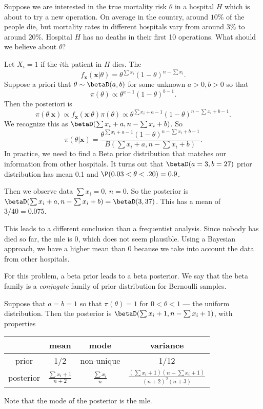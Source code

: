 \documentclass[a4paper]{article}
\begin{document}
\begin{eg}
  Suppose we are interested in the true mortality risk $\theta$ in a hospital $H$ which is about to try a new operation. On average in the country, around $10\%$ of the people die, but mortality rates in different hospitals vary from around $3\%$ to around $20\%$. Hospital $H$ has no deaths in their first 10 operations. What should we believe about $\theta$?

  Let $X_i = 1$ if the $i$th patient in $H$ dies. The
  \[
    f_{\mathbf{x}}(\mathbf{x}|\theta) = \theta^{\sum x_i}(1 - \theta)^{n - \sum x_i}.
  \]
  Suppose a priori that $\theta\sim \betaD(a, b)$ for some unknown $a > 0, b > 0$ so that
  \[
    \pi(\theta)\propto \theta^{a - 1}(1 - \theta)^{b - 1}.
  \]
  Then the posteriori is
  \[
    \pi(\theta|\mathbf{x})\propto f_{\mathbf{x}}(\mathbf{x}|\theta)\pi(\theta)\propto \theta^{\sum x_i + a - 1}(1 - \theta)^{n- \sum x_i + b - 1}.
  \]
  We recognize this as $\betaD(\sum x_i + a, n - \sum x_i + b)$. So
  \[
    \pi(\theta|\mathbf{x}) = \frac{\theta^{\sum x_i + a - 1}(1 - \theta)^{n - \sum x_i + b - 1}}{B(\sum x_i + a, n - \sum x_i + b)}.
  \]
  In practice, we need to find a Beta prior distribution that matches our information from other hospitals. It turns out that $\betaD(a = 3, b = 27)$ prior distribution has mean 0.1 and $\P(0.03 < \theta < .20) = 0.9$.

  Then we observe data $\sum x_i = 0$, $n = 0$. So the posterior is $\betaD(\sum x_i + a, n - \sum x_i + b) = \betaD(3, 37)$. This has a mean of $3/40 = 0.075$.

  This leads to a different conclusion than a frequentist analysis. Since nobody has died so far, the mle is $0$, which does not seem plausible. Using a Bayesian approach, we have a higher mean than $0$ because we take into account the data from other hospitals.
\end{eg}

For this problem, a beta prior leads to a beta posterior. We say that the beta family is a \emph{conjugate} family of prior distribution for Bernoulli samples.

Suppose that $a = b = 1$ so that $\pi (\theta) = 1$ for $0 < \theta < 1$ --- the uniform distribution. Then the posterior is $\betaD(\sum x_i + 1, n - \sum x_i + 1)$, with properties
\begin{center}
  \begin{tabular}[]{cccc}
    \toprule
    &mean & mode & variance\\
    \midrule
    prior & 1/2 & non-unique & 1/12\\
    posterior & $\displaystyle \frac{\sum x_i + 1}{n + 2}$ & $\displaystyle \frac{\sum x_i}{n}$ & $\displaystyle\frac{(\sum x_i + 1)(n - \sum x_i + 1)}{(n + 2)^2(n + 3)}$\\
    \bottomrule
  \end{tabular}
\end{center}
Note that the mode of the posterior is the mle.
\end{document}
